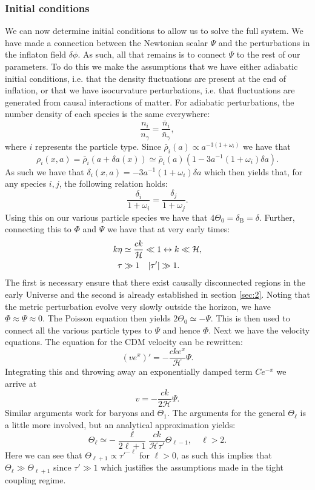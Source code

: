 \documentclass[%
reprint,
 amsmath,amssymb,
 aps,
]{revtex4-2}
\newcommand{\Hp}{\mathcal{H}}
\begin{document}
\subsubsection{Initial conditions}
We can now determine initial conditions to allow us to solve the full system. We have made a connection between the Newtonian scalar $\Psi$ and the perturbations in the inflaton field $\delta\phi$. As such, all that remains is to connect $\Psi$ to the rest of our parameters. To do this we make the assumptions that we have either adiabatic initial conditions, i.e. that the density fluctuations are present at the end of inflation, or that we have isocurvature perturbations, i.e. that fluctuations are generated from causal interactions of matter. For adiabatic perturbations, the number density of each species is the same everywhere:
\[\frac{n_i}{n_\gamma}=\frac{\bar n_i}{\bar n_\gamma},\]
where $i$ represents the particle type. Since $\bar\rho_i(a)\propto a^{-3(1+\omega_i)}$ \cite{Carroll:2004st} we have that
\[\rho_i(x,a)=\bar\rho_i(a+\delta a(x))\simeq\bar\rho_i(a)(1-3a^{-1}(1+\omega_i)\delta a).\]
As such we have that $\delta_i(x,a)=-3a^{-1}(1+\omega_i)\delta a$ which then yields that, for any species $i,j$, the following relation holds:
\[\frac{\delta_i}{1+\omega_i}=\frac{\delta_j}{1+\omega_j}.\]
Using this on our various particle species we have that $4\Theta_0=\delta_\text{B}=\delta$. Further, connecting this to $\Phi$ and $\Psi$ we have that at very early times:
\begin{align*}
	k\eta&\simeq \frac{ck}{\Hp}\ll1\leftrightarrow k\ll\Hp,\\
	\tau&\gg1\quad\abs{\tau'}\gg1.
\end{align*}
The first is necessary ensure that there exist causally disconnected regions in the early Universe and the second is already established in section \ref{sec:2}. Noting that the metric perturbation evolve very slowly outside the horizon, we have $\Phi\approx\Psi\approx0$. The Poisson equation then yields $2\Theta_0\simeq-\Psi$. This is then used to connect all the various particle types to $\Psi$ and hence $\Phi$. Next we have the velocity equations. The equation for the CDM velocity can be rewritten:
\[(ve^x)'=-\frac{cke^x}{\Hp}\Psi.\]
Integrating this and throwing away an exponentially damped term $Ce^{-x}$ we arrive at
\[v=-\frac{ck}{2\Hp}\Psi.\]
Similar arguments work for baryons and $\Theta_1$. The arguments for the general $\Theta_\ell$ is a little more involved, but an analytical approximation yields: \cite{AST5220LectureNotes}
\[\Theta_\ell\simeq-\frac{\ell}{2\ell+1}\frac{ck}{\Hp\tau'}\Theta_{\ell-1},\quad \ell>2.\]
Here we can see that $\Theta_{\ell+1}\propto\tau'^{-\ell}$ for $\ell>0$, as such this implies that $\Theta_\ell\gg\Theta_{\ell+1}$ since $\tau'\gg1$ which justifies the assumptions made in the tight coupling regime. 
\end{document}
